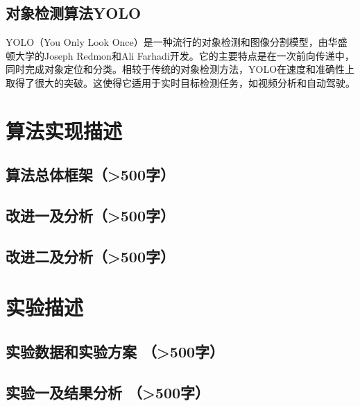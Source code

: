 \documentclass{article}
\begin{document}
\subsection{对象检测算法YOLO}
YOLO（You Only Look Once）\cite{ref9}是一种流行的对象检测和图像分割模型，由华盛顿大学的Joseph Redmon和Ali Farhadi开发。它的主要特点是在一次前向传递中，同时完成对象定位和分类。相较于传统的对象检测方法，YOLO在速度和准确性上取得了很大的突破。这使得它适用于实时目标检测任务，如视频分析和自动驾驶。


\section{算法实现描述}


\subsection{算法总体框架（>500字）}


\subsection{改进一及分析（>500字）}

\subsection{改进二及分析（>500字）}



\section{实验描述}
\subsection{实验数据和实验方案 （>500字）}


\subsection{实验一及结果分析 （>500字）}
\end{document}
